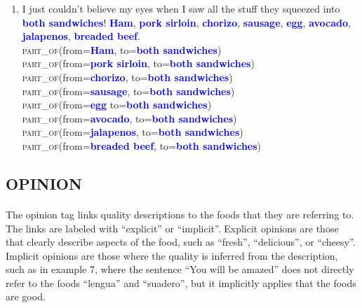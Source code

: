 \documentclass{article}
\begin{document}
\begin{enumerate}[resume]
\item I just couldn't believe my eyes when I saw all the stuff they squeezed into \textbf{\textcolor{blue}{both sandwiches}}! \textbf{\textcolor{blue}{Ham}}, \textbf{\textcolor{blue}{pork sirloin}}, \textbf{\textcolor{blue}{chorizo}}, \textbf{\textcolor{blue}{sausage}}, \textbf{\textcolor{blue}{egg}}, \textbf{\textcolor{blue}{avocado}}, \textbf{\textcolor{blue}{jalapenos}}, \textbf{\textcolor{blue}{breaded beef}}.\\
\textsc{part\_of}(from=\textbf{\textcolor{blue}{Ham}}, to=\textbf{\textcolor{blue}{both sandwiches}}) \\
\textsc{part\_of}(from=\textbf{\textcolor{blue}{pork sirloin}}, to=\textbf{\textcolor{blue}{both sandwiches}}) \\
\textsc{part\_of}(from=\textbf{\textcolor{blue}{chorizo}}, to=\textbf{\textcolor{blue}{both sandwiches}}) \\
\textsc{part\_of}(from=\textbf{\textcolor{blue}{sausage}}, to=\textbf{\textcolor{blue}{both sandwiches}}) \\
\textsc{part\_of}(from=\textbf{\textcolor{blue}{egg}} to=\textbf{\textcolor{blue}{both sandwiches}}) \\
\textsc{part\_of}(from=\textbf{\textcolor{blue}{avocado}}, to=\textbf{\textcolor{blue}{both sandwiches}}) \\
\textsc{part\_of}(from=\textbf{\textcolor{blue}{jalapenos}}, to=\textbf{\textcolor{blue}{both sandwiches}}) \\
\textsc{part\_of}(from=\textbf{\textcolor{blue}{breaded beef}}, to=\textbf{\textcolor{blue}{both sandwiches}}) \\
\end{enumerate}

\subsection{OPINION}
\paragraph{}
The opinion tag links quality descriptions to the foods that they are referring to. The links are labeled with “explicit” or “implicit”. Explicit opinions are those that clearly describe aspects of the food, such as “fresh”, “delicious”, or “cheesy”. Implicit opinions are those where the quality is inferred from the description, such as in example 7, where the sentence “You will be amazed” does not directly refer to the foods “lengua” and “suadero”, but it implicitly applies that the foods are good. 
\end{document}
